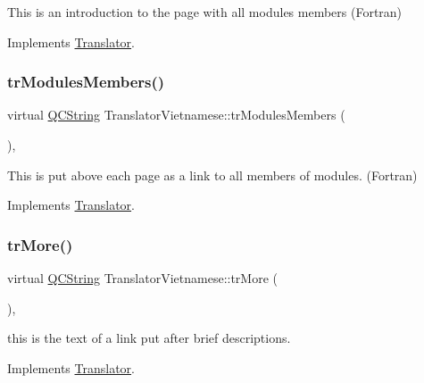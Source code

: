 This is an introduction to the page with all modules members (Fortran) 

Implements \mbox{\hyperlink{class_translator}{Translator}}.

\mbox{\label{class_translator_vietnamese_a15883ef8391aa4941410dacc48a802c8}} 
\subsubsection{\texorpdfstring{trModulesMembers()}{trModulesMembers()}}
{\footnotesize\ttfamily virtual \mbox{\hyperlink{class_q_c_string}{Q\+C\+String}} Translator\+Vietnamese\+::tr\+Modules\+Members (\begin{DoxyParamCaption}{ }\end{DoxyParamCaption})\hspace{0.3cm}{\ttfamily [inline]}, {\ttfamily [virtual]}}

This is put above each page as a link to all members of modules. (Fortran) 

Implements \mbox{\hyperlink{class_translator}{Translator}}.

\mbox{\label{class_translator_vietnamese_abd0466ab588941eab92359540e5b1af9}} 
\subsubsection{\texorpdfstring{trMore()}{trMore()}}
{\footnotesize\ttfamily virtual \mbox{\hyperlink{class_q_c_string}{Q\+C\+String}} Translator\+Vietnamese\+::tr\+More (\begin{DoxyParamCaption}{ }\end{DoxyParamCaption})\hspace{0.3cm}{\ttfamily [inline]}, {\ttfamily [virtual]}}

this is the text of a link put after brief descriptions. 

Implements \mbox{\hyperlink{class_translator}{Translator}}.

\mbox{\label{class_translator_vietnamese_aa10fd8916c5d4d35a225a7202db0498b}} 
